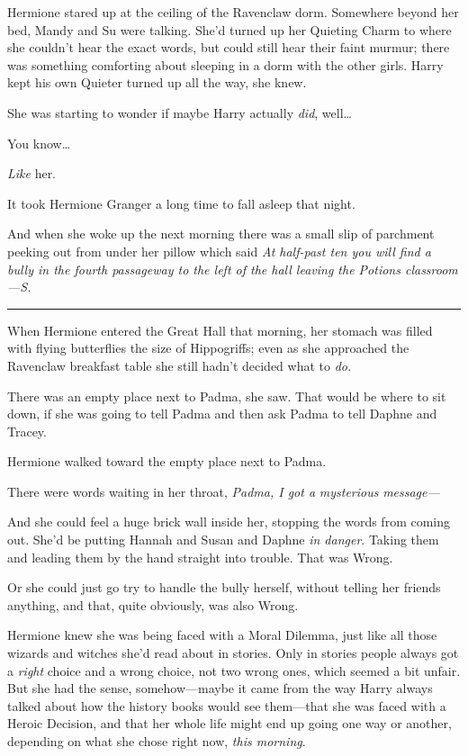 Hermione stared up at the ceiling of the Ravenclaw dorm. Somewhere
beyond her bed, Mandy and Su were talking. She'd turned up her Quieting
Charm to where she couldn't hear the exact words, but could still hear
their faint murmur; there was something comforting about sleeping in a
dorm with the other girls. Harry kept his own Quieter turned up all the
way, she knew.

She was starting to wonder if maybe Harry actually \emph{did},
well\ldots{}

You know\ldots{}

\emph{Like} her.

It took Hermione Granger a long time to fall asleep that night.

And when she woke up the next morning there was a small slip of
parchment peeking out from under her pillow which said \emph{At
half-past ten you will find a bully in the fourth passageway to the left
of the hall leaving the Potions classroom---S.}

\begin{center}\rule{3in}{0.4pt}\end{center}

When Hermione entered the Great Hall that morning, her stomach was
filled with flying butterflies the size of Hippogriffs; even as she
approached the Ravenclaw breakfast table she still hadn't decided what
to \emph{do.}

There was an empty place next to Padma, she saw. That would be where to
sit down, if she was going to tell Padma and then ask Padma to tell
Daphne and Tracey.

Hermione walked toward the empty place next to Padma.

There were words waiting in her throat, \emph{Padma, I got a}
\emph{mysterious} \emph{message---}

And she could feel a huge brick wall inside her, stopping the words from
coming out. She'd be putting Hannah and Susan and Daphne \emph{in
danger}. Taking them and leading them by the hand straight into trouble.
That was Wrong.

Or she could just go try to handle the bully herself, without telling
her friends anything, and that, quite obviously, was also Wrong.

Hermione knew she was being faced with a Moral Dilemma, just like all
those wizards and witches she'd read about in stories. Only in stories
people always got a \emph{right} choice and a wrong choice, not two
wrong ones, which seemed a bit unfair. But she had the sense,
somehow---maybe it came from the way Harry always talked about how the
history books would see them---that she was faced with a Heroic
Decision, and that her whole life might end up going one way or another,
depending on what she chose right now, \emph{this morning}.


